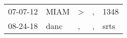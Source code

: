\begin{supertabular}{p{0.07\textwidth}p{0.06\textwidth}p{0.02\textwidth}p{0.02\textwidth}p{0.06\textwidth}}
 07-07-12\textsuperscript{} &  MIAM\textsuperscript{} &  \textgreater &  , &  1348\textsuperscript{} \\
 08-24-18\textsuperscript{} &  danc\textsuperscript{} &             , &  , &  srts\textsuperscript{} \\
\end{supertabular}

